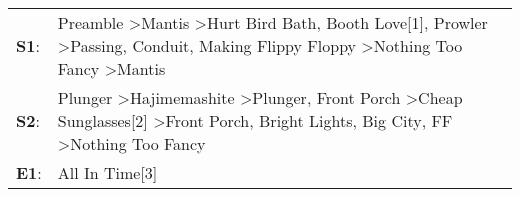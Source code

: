 \begin{supertabular}{p{0.03\textwidth}p{0.92\textwidth}}
 \textbf{S1}:  &  Preamble\textsuperscript{} \textgreater \enspace Mantis\textsuperscript{} \textgreater \enspace Hurt Bird Bath\textsuperscript{}, \enspace Booth Love[1]\textsuperscript{}, \enspace Prowler\textsuperscript{} \textgreater \enspace Passing\textsuperscript{}, \enspace Conduit\textsuperscript{}, \enspace Making Flippy Floppy\textsuperscript{} \textgreater \enspace Nothing Too Fancy\textsuperscript{} \textgreater \enspace Mantis\textsuperscript{}  \enspace  \\
 \textbf{S2}:  &                          Plunger\textsuperscript{} \textgreater \enspace Hajimemashite\textsuperscript{} \textgreater \enspace Plunger\textsuperscript{}, \enspace Front Porch\textsuperscript{} \textgreater \enspace Cheap Sunglasses[2]\textsuperscript{} \textgreater \enspace Front Porch\textsuperscript{}, \enspace Bright Lights, Big City\textsuperscript{}, \enspace FF\textsuperscript{} \textgreater \enspace Nothing Too Fancy\textsuperscript{}  \enspace  \\
 \textbf{E1}:  &                                                                                                                                                                                                                                                                                                                                                                                                                              All In Time[3]\textsuperscript{}  \enspace  \\
\end{supertabular}
